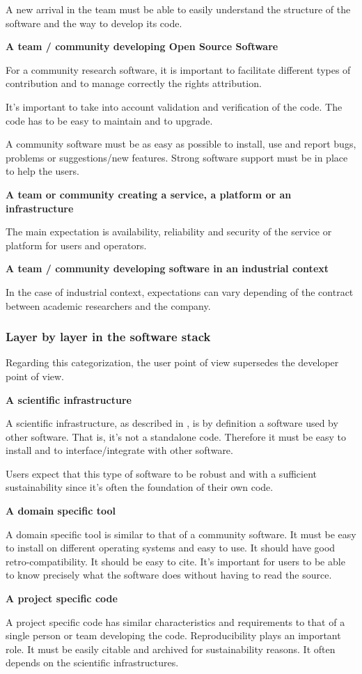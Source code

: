 A new arrival in the team must be able to easily understand the structure of the software and the way to develop its code.

\textbf{A team / community developing Open Source Software}

For a community research software, it is important to facilitate different types of contribution and to manage correctly the rights attribution.

It's important to take into account validation and verification of the code. The code has to be easy to maintain and to upgrade.

A community software must be as easy as possible to install, use and report bugs, problems or suggestions/new features. Strong software support must be in place to help the users.

\textbf{A team or community creating a service, a platform or an infrastructure}

The main expectation is availability, reliability and security of the service or platform for users and operators.

\textbf{A team / community developing software in an industrial context}

In the case of industrial context, expectations can vary depending of the contract between academic researchers and the company.

\subsubsection{Layer by layer in the software stack}

Regarding this categorization, the user point of view supersedes the developer point of view.

\textbf{A scientific infrastructure}

A scientific infrastructure, as described in \cite{hinsen2019}, is by definition a software used by other software. That is, it's not a standalone code. Therefore it must be easy to install and to interface/integrate with other software.

Users expect that this type of software to be robust and with a sufficient sustainability since it's often the foundation of their own code.

\textbf{A domain specific tool}

A domain specific tool is similar to that of a community software. It must be easy to install on different operating systems and easy to use. It should have good retro-compatibility. It should be easy to cite. It's important for users to be able to know precisely what the software does without having to read the source. 

\textbf{A project specific code}

A project specific code has similar characteristics and requirements to that of a single person or team developing the code. Reproducibility plays an important role. It must be easily citable and archived for sustainability reasons. It often depends on the scientific infrastructures.
